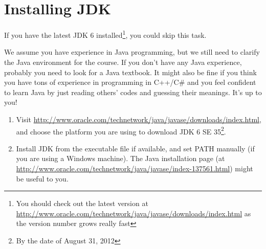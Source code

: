 
\section{Installing JDK}

If you have the latest JDK 6 installed\footnote{You should check out the latest version at \url{http://www.oracle.com/technetwork/java/javase/downloads/index.html} as the version number grows really fast}, you could skip this task.

We assume you have experience in Java programming, but we still need to clarify the Java environment for the course. If you don't have any Java experience, probably you need to look for a Java textbook. It might also be fine if you think you have tons of experience in programming in C++/C\# and you feel confident to learn Java by just reading others' codes and guessing their meanings. It's up to you!

\begin{enumerate}
\item Visit \url{http://www.oracle.com/technetwork/java/javase/downloads/index.html}, and choose the platform you are using to download JDK 6 SE 35\footnote{By the date of August 31, 2012}.


\item Install JDK from the executable file if available, and set PATH manually (if you are using a Windows machine). The Java installation page (at \url{http://www.oracle.com/technetwork/java/javase/index-137561.html}) might be useful to you.
\end{enumerate}